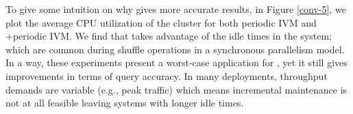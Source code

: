 To give some intuition on why \svc gives more accurate results, in Figure \ref{conv-5}, we plot the average CPU utilization of the cluster for both periodic IVM and \svcnospace+periodic IVM. 
We find that \svc takes advantage of the idle times in the system; which are common during shuffle operations in a synchronous parallelism model.
In a way, these experiments present a worst-case application for \svc, yet it still gives improvements in terms of query accuracy.
In many deployments, throughput demands are variable (e.g., peak traffic) which means incremental maintenance is not at all feasible leaving systems with longer idle times.
\fi



